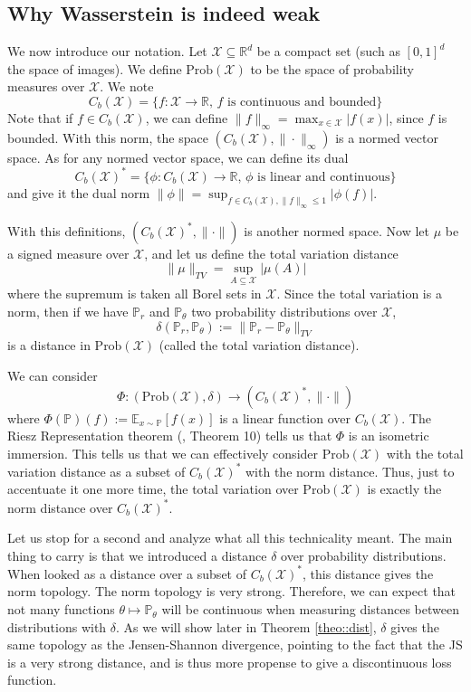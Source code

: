 \documentclass{article} %
\newcommand\EE{\mathbb{E}}
\newcommand\PP{\mathbb{P}}
\newcommand\RR{\mathbb{R}}
\theoremstyle{definition}
\theoremstyle{definition}
\newcommand\manX{\mathcal{X}}
\begin{document}
\begin{appendices}
\section{Why Wasserstein is indeed weak} \label{app::weak}
We now introduce our notation. Let $\mathcal{X} \subseteq{\RR^d}$
be a compact set (such as $[0,1]^d$ the space of images). We define
$\text{Prob}(\manX)$ to be the space of probability measures over
$\manX$. We note
$$C_b(\manX) = \{f: \manX \to \RR \text{, $f$ is continuous and bounded}\}$$
Note that if $f \in C_b(\manX)$,
we can define $\|f\|_\infty = \max_{x \in \manX} |f(x)|$, since
$f$ is bounded. With this norm, the space $(C_b(\manX), \|\cdot\|_\infty)$
is a normed vector space. As for any normed vector space, we can define
its dual
$$ C_b(\manX)^* = \{\phi: C_b(\manX) \rightarrow \RR \text{, $\phi$ is linear
and continuous} \} $$
and give it the dual norm $\|\phi\| = \sup_{f \in C_b(\manX), \|f\|_\infty \leq 1} |\phi(f)|$.

With this definitions, $(C_b(\manX)^*, \|\cdot\|)$ is another normed space.
Now let $\mu$ be a signed measure over $\manX$, and let us define
the total variation distance
$$\|\mu\|_{TV} = \sup_{A \subseteq \manX} |\mu(A)|$$
where the supremum is taken all Borel sets in $\manX$.
Since the total variation is a norm, then if we have $\PP_r$
and $\PP_\theta$ two probability distributions over $\manX$,
$$\delta(\PP_r, \PP_\theta) := \|\PP_r - \PP_\theta\|_{TV}$$
is a distance in $\text{Prob}(\manX)$ (called the total variation
distance).

We can consider
$$ \Phi: (\text{Prob}(\manX), \delta) \rightarrow (C_b(\manX)^*, \|\cdot \|)$$
where $\Phi(\PP)(f) := \EE_{x \sim \PP}[f(x)]$ is a linear function
over $C_b(\manX)$. The Riesz Representation theorem (\cite{Kakutani-Riesz},
Theorem 10) tells us that $\Phi$ is an isometric immersion. This
tells us that we can effectively consider $\text{Prob}(\manX)$ with
the total variation distance as a subset of $C_b(\manX)^*$ with
the norm distance. Thus, just to accentuate it one more time,
the total variation over $\text{Prob}(\manX)$ is exactly
the norm distance over $C_b(\manX)^*$.

Let us stop for a second and analyze what all this technicality meant.
The main thing to carry is that we introduced a distance $\delta$
over probability distributions. When looked as a distance over
a subset of $C_b(\manX)^*$, this distance gives the norm topology.
The norm topology is very strong. Therefore, we can expect that
not many functions $\theta \mapsto \PP_\theta$ will be continuous
when measuring distances between distributions with $\delta$. As
we will show later in Theorem \autoref{theo::dist}, $\delta$ gives the same topology
as the Jensen-Shannon divergence, pointing to the fact that the
JS is a very strong distance, and is thus more propense to
give a discontinuous loss function.


\end{appendices}
\end{document}

